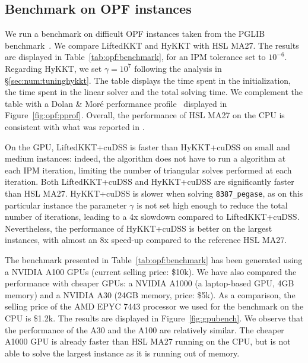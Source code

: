 \subsection{Benchmark on OPF instances}
\label{sec:num:opf}
We run a benchmark on difficult OPF instances taken
from the PGLIB benchmark~\cite{babaeinejadsarookolaee2019power}.
We compare LiftedKKT and HyKKT with HSL MA27.
The results are displayed in Table~\ref{tab:opf:benchmark},
for an IPM tolerance set to $10^{-6}$.
Regarding HyKKT, we set $\gamma = 10^7$ following the analysis in \S\ref{sec:num:tuninghykkt}.
The table displays the time spent in the initialization, the time spent in the linear solver and the total
solving time.
We complement the table with a Dolan \& Moré performance profile~\cite{dolan2002benchmarking} displayed
in Figure~\ref{fig:opf:pprof}.
Overall, the performance of HSL MA27 on the CPU is consistent with what was reported
in \cite{babaeinejadsarookolaee2019power}.

On the GPU, LiftedKKT+cuDSS is faster than HyKKT+cuDSS on small and medium instances: indeed, the algorithm
does not have to run a \CG algorithm at each IPM iteration, limiting the number
of triangular solves performed at each iteration.
Both LiftedKKT+cuDSS and HyKKT+cuDSS are significantly faster than HSL MA27.
HyKKT+cuDSS is slower when solving {\tt 8387\_pegase}, as on this particular instance
the parameter $\gamma$ is not set high enough to reduce the
total number of \CG iterations, leading to a 4x slowdown compared to LiftedKKT+cuDSS.
Nevertheless, the performance of HyKKT+cuDSS is better on the largest instances,
with almost an 8x speed-up compared to the reference HSL MA27.

The benchmark presented in Table~\ref{tab:opf:benchmark} has been generated using a
NVIDIA A100 GPUs (current selling price: \$10k). We have also compared the performance
with cheaper GPUs: a NVIDIA A1000 (a laptop-based GPU, 4GB memory) and a NVIDIA A30
(24GB memory, price: \$5k).
As a comparison, the selling price of the AMD EPYC
7443 processor we used for the benchmark on the CPU is \$1.2k. The results are
displayed in Figure~\ref{fig:gpubench}. We observe that the performance of the A30
and the A100 are relatively similar. The cheaper A1000 GPU is already faster
than HSL MA27 running on the CPU, but is not able to solve the largest instance as it is running out of memory.

